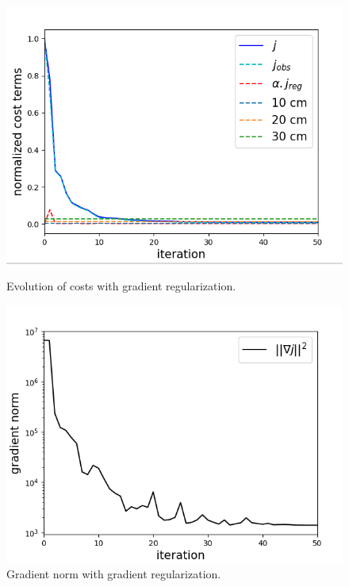\documentclass{article}
\begin{document}
\begin{figure}[H]
    \centering
    \begin{minipage}[b]{0.48\linewidth}
        \centering
        \includegraphics[width=\linewidth]{Images_Ayoub/With_Regularisation/Gradient/Costs.png}
        \caption{Evolution of costs with gradient regularization.}
        \label{fig:grad-costs}
    \end{minipage}
    \hfill
    \begin{minipage}[b]{0.48\linewidth}
        \centering
        \includegraphics[width=\linewidth]{Images_Ayoub/With_Regularisation/Gradient/Gradient.png}
        \caption{Gradient norm with gradient regularization.}
        \label{fig:grad-gradient}
    \end{minipage}
    

\end{figure}
\end{document}
